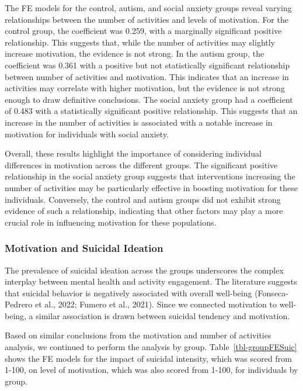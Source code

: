 \documentclass[
  letterpaper,
  number,
  review,
  3p]{elsarticle}
\begin{document}
The FE models for the control, autism, and social anxiety groups reveal
varying relationships between the number of activities and levels of
motivation. For the control group, the coefficient was 0.259, with a
marginally significant positive relationship. This suggests that, while
the number of activities may slightly increase motivation, the evidence
is not strong. In the autism group, the coefficient was 0.361 with a
positive but not statistically significant relationship between number
of activities and motivation. This indicates that an increase in
activities may correlate with higher motivation, but the evidence is not
strong enough to draw definitive conclusions. The social anxiety group
had a coefficient of 0.483 with a statistically significant positive
relationship. This suggests that an increase in the number of activities
is associated with a notable increase in motivation for individuals with
social anxiety.

Overall, these results highlight the importance of considering
individual differences in motivation across the different groups. The
significant positive relationship in the social anxiety group suggests
that interventions increasing the number of activities may be
particularly effective in boosting motivation for these individuals.
Conversely, the control and autism groups did not exhibit strong
evidence of such a relationship, indicating that other factors may play
a more crucial role in influencing motivation for these populations.

\subsubsection{Motivation and Suicidal
Ideation}\label{motivation-and-suicidal-ideation}

The prevalence of suicidal ideation across the groups underscores the
complex interplay between mental health and activity engagement. The
literature suggests that suicidal behavior is negatively associated with
overall well-being (Fonseca-Pedrero et al., 2022; Fumero et al., 2021).
Since we connected motivation to well-being, a similar association is
drawn between suicidal tendency and motivation.

Based on similar conclusions from the motivation and number of
activities analysis, we continued to perform the analysis by group.
Table~\ref{tbl-groupFESuic} shows the FE models for the impact of
suicidal intensity, which was scored from 1-100, on level of motivation,
which was also scored from 1-100, for individuals by group.
\end{document}
